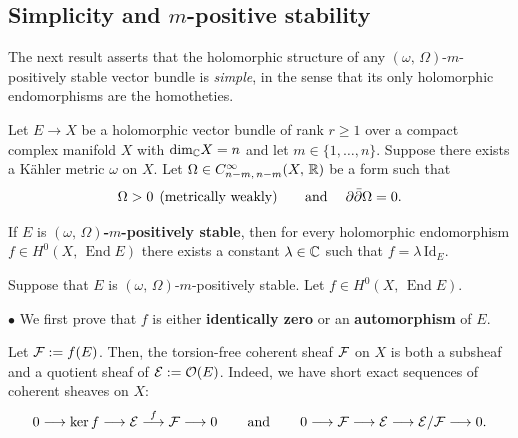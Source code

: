 \documentclass[12pt]{article}
\begin{document}
\subsection{Simplicity and $m$-positive stability}\label{subsection:simplicity-stability}

The next result asserts that the holomorphic structure of any $(\omega,\,\Omega)$-$m$-positively stable vector bundle is {\it simple}, in the sense that its only holomorphic endomorphisms are the homotheties. 


\begin{The}\label{The:m-pos-stable_implies_simple} Let $E\longrightarrow X$ be a holomorphic vector bundle of rank $r\geq 1$ over a compact complex manifold $X$ with $\mbox{dim}_{\mathbb{C}} X =n$ and let $m\in\{1,\dots , n\}$. Suppose there exists a K\"ahler metric $\omega$ on $X$. Let $\Omega\in C^\infty_{n-m,\,n-m}(X,\,\mathbb{R})$ be a form such that \begin{eqnarray*}\Omega>0 \hspace{1ex} \mbox{(metrically weakly) \hspace{3ex} and} \hspace{3ex} \partial\bar\partial\Omega = 0.\end{eqnarray*}

  If $E$ is {\bf $(\omega,\,\Omega)$-$m$-positively stable}, then for every holomorphic endomorphism $f\in H^0(X,\,\operatorname{End} E)$ there exists a constant $\lambda\in\mathbb{C}$ such that $f = \lambda\,\mbox{Id}_E$.

\end{The}
  

 Suppose that $E$ is $(\omega,\,\Omega)$-$m$-positively stable. Let $f\in H^0(X,\,\operatorname{End} E)$.

\vspace{1ex}

$\bullet$ We first prove that $f$ is either {\bf identically zero} or an {\bf automorphism} of $E$.

Let ${\cal F}:=f(E)$. Then, the torsion-free coherent sheaf ${\cal F}$ on $X$ is both a subsheaf and a quotient sheaf of ${\cal E}:={\cal O}(E)$. Indeed, we have short exact sequences of coherent sheaves on $X$: \begin{eqnarray}\label{eqn:seq_F-quotient_sub}0\longrightarrow\ker f\longrightarrow{\cal E}\stackrel{f}{\longrightarrow}{\cal F}\longrightarrow 0 \hspace{5ex}\mbox{and}\hspace{5ex} 0\longrightarrow{\cal F}\longrightarrow{\cal E}\longrightarrow {\cal E}/{\cal F}\longrightarrow 0.\end{eqnarray}
\end{document}
